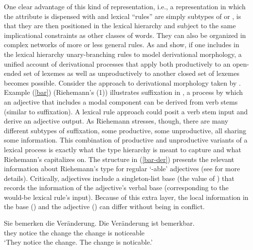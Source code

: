 \documentclass[output=paper
 	        ,biblatex
                ,babelshorthands
                ,newtxmath
                ,draftmode
                ,colorlinks, citecolor=brown
]{langscibook}
\begin{document}
One clear advantage of this kind of representation, i.e., a representation in which the attribute  is dispensed with and lexical ``rules'' are simply subtypes of  or , is that they are then positioned in the lexical hierarchy and subject to the same implicational constraints as other classes of words. 
They can also be organized in complex networks of more or less general rules. 
As \citet{Riehemann1998} and \citet{Koenig1999c} show, if one includes in the lexical hierarchy unary-branching rules to model derivational morphology, a unified account of derivational processes that apply both productively to an open-ended set of lexemes as well as unproductively to another closed set of lexemes becomes possible. 
Consider the approach to derivational morphology taken by \citet{Riehemann1998}. 
Example (\ref{bar}) (Riehemann's (1)) illustrates  suffixation   in , a process by which an adjective that includes a modal component can be derived from verb stems (similar to   suffixation). 
A lexical rule approach could posit a verb stem input and derive an adjective output. 
As Riehemann stresses, though, there are many different subtypes of  suffixation, some productive, some unproductive, all sharing some information. 
This combination of productive and unproductive variants of a lexical process is exactly what the type hierarchy is meant to capture and what Riehemann's  capitalizes on. 
The structure in (\ref{bar-der}) presents the relevant information about Riehemann's type for regular  `-able' adjectives (see \citealt[68]{Riehemann1998} for more details). 
Critically,  adjectives include a singleton-list base (the value of ) that records the information of the adjective's verbal base (corresponding to the would-be lexical rule's input). 
Because of this extra layer, the local information in the base () and the  adjective () can differ without being in conflict.

\ea
\label{bar}
\gll Sie  bemerken die Veränderung. Die Veränderung ist bemerkbar. \\
     they notice   the change       the change      is  noticeable \\
\glt `They notice the change. The change is noticable.'
\z
\end{document}
